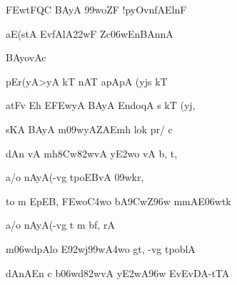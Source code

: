 {\dn \3FEwtFQC BAyA{\rdt} \399woZF{\qva} !pyOvnfAElnF \dontdisplaylinenum}

{\dn aE(stA\2 EvfAlA\322wF{\qva} Z\0c\306wEnBAnnA \vegdn\dontdisplaylinenum}

{\dn BAyo{\qvb}vAc{\dandabdn}\dontdisplaylinenum }

{\dn pEr(yA>yA kT\2 nAT apApA\2 (yjs\? kT \dontdisplaylinenum}

{\dn atFv Eh E\3FEwyA\2 BAyA{\rdt} Endo{\qvb}qA\2 s kT\2 (yj\?, \vegdn\dontdisplaylinenum}

{\dn sKA BAyA\0 m\309wyAZAEmh lok\? pr/ c{\dandabdn} \dontdisplaylinenum}

{\dn dAn\2 vA mh\38Cw\382wvA y\3E2wo vA b, t, \vegdn\dontdisplaylinenum}

{\dn a/o nAyA(-vg{\rdt} tpoEBvA\0 \309wkr\4,{\dandabdn} \dontdisplaylinenum}

{\dn {}to m\? EpEB, \3FEwo\3C4wo b\5A\39CwZ\4\396w mmAE\306wtk\? \vegdn\dontdisplaylinenum}

{\dn a/o nAyA(-vg{\rdt} t\2 m\? bf, rA{\dandabdn} \dontdisplaylinenum}

{\dn m\306wdpAlo E\392wj\399w\?\3A4wo gt, -vg{\rdt} tpoblA \vegdn\dontdisplaylinenum}

{\dn dAnAEn c b\306wd\382wvA y\3E2wA\2\396w EvEvDA\2-tTA{\dandabdn} \dontdisplaylinenum}

